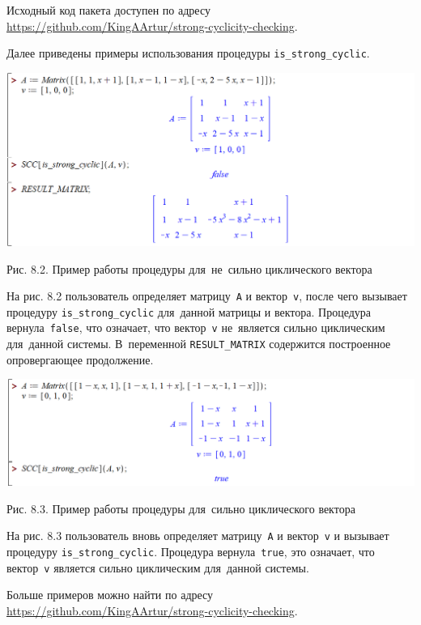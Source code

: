 Исходный код пакета доступен по адресу\\
\url{https://github.com/KingAArtur/strong-cyclicity-checking}.

\medskip
Далее приведены примеры использования процедуры \verb|is_strong_cyclic|.


\begin{center}
    \includegraphics[scale=0.6]{pictures/maple_example4.png}

    \small
    Рис. 8.2. Пример работы процедуры для~не~сильно циклического вектора
\end{center}

На рис. 8.2 пользователь определяет матрицу~\verb|A| и вектор~\verb|v|,
после чего вызывает процедуру \verb|is_strong_cyclic| для~данной матрицы и вектора.
Процедура вернула~\verb|false|, что означает, что вектор~\verb|v| не~является сильно циклическим для~данной системы.
В~переменной \verb|RESULT_MATRIX| содержится построенное опровергающее продолжение.

\begin{center}
    \includegraphics[scale=0.6]{pictures/maple_example1.png}

    \small
    Рис. 8.3. Пример работы процедуры для~сильно циклического вектора
\end{center}

На рис. 8.3 пользователь вновь определяет матрицу~\verb|A| и вектор~\verb|v| и
вызывает процедуру \verb|is_strong_cyclic|.
Процедура вернула~\verb|true|, это означает, что вектор~\verb|v| является сильно циклическим для~данной системы.

Больше примеров можно найти по адресу\\
\url{https://github.com/KingAArtur/strong-cyclicity-checking}.